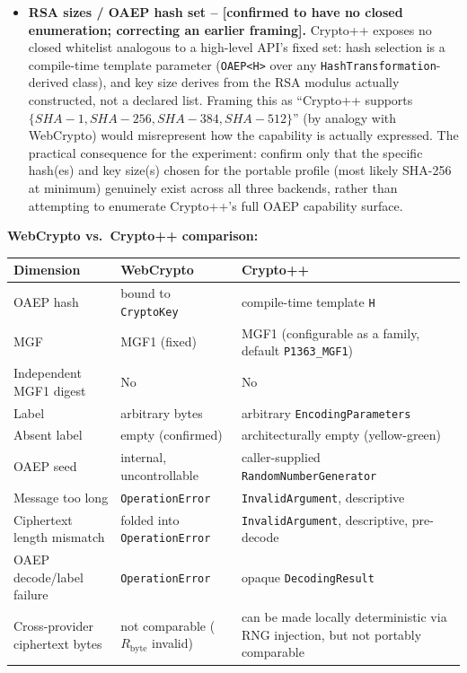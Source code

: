 \documentclass[11pt,a4paper]{article}
\begin{document}
\begin{itemize}
\item \textbf{RSA sizes / OAEP hash set -- [confirmed to have no closed enumeration; correcting an earlier framing].} Crypto++ exposes no closed whitelist analogous to a high-level API's fixed set: hash selection is a compile-time template parameter (\texttt{OAEP<H>} over any \texttt{HashTransformation}-derived class), and key size derives from the RSA modulus actually constructed, not a declared list. Framing this as ``Crypto++ supports $\{SHA{-}1, SHA{-}256, SHA{-}384, SHA{-}512\}$'' (by analogy with WebCrypto) would misrepresent how the capability is actually expressed. The practical consequence for the experiment: confirm only that the specific hash(es) and key size(s) chosen for the portable profile (most likely SHA-256 at minimum) genuinely exist across all three backends, rather than attempting to enumerate Crypto++'s full OAEP capability surface.
\end{itemize}

\textbf{WebCrypto vs.\ Crypto++ comparison:}
\begin{center}
\begin{tabularx}{\textwidth}{@{}l>{\raggedright\arraybackslash}X>{\raggedright\arraybackslash}X@{}}
\toprule
Dimension & WebCrypto & Crypto++ \\
\midrule
OAEP hash & bound to \texttt{CryptoKey} & compile-time template \texttt{H} \\
MGF & MGF1 (fixed) & MGF1 (configurable as a family, default \texttt{P1363\_MGF1}) \\
Independent MGF1 digest & No & No \\
Label & arbitrary bytes & arbitrary \texttt{EncodingParameters} \\
Absent label & empty (confirmed) & architecturally empty (yellow-green) \\
OAEP seed & internal, uncontrollable & caller-supplied \texttt{RandomNumberGenerator} \\
Message too long & \texttt{OperationError} & \texttt{InvalidArgument}, descriptive \\
Ciphertext length mismatch & folded into \texttt{OperationError} & \texttt{InvalidArgument}, descriptive, pre-decode \\
OAEP decode/label failure & \texttt{OperationError} & opaque \texttt{DecodingResult} \\
Cross-provider ciphertext bytes & not comparable ($R_{\text{byte}}$ invalid) & can be made locally deterministic via RNG injection, but not portably comparable \\
\bottomrule
\end{tabularx}
\end{center}
\end{document}
